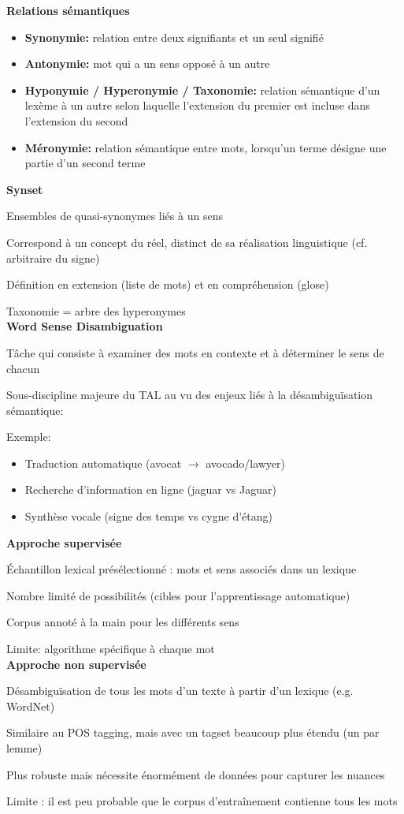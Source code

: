 \textbf{Relations sémantiques}

\begin{itemize}
\item \textbf{Synonymie:} relation entre deux signifiants et un seul signifié
\item \textbf{Antonymie:} mot qui a un sens opposé à un autre
\item \textbf{Hyponymie / Hyperonymie / Taxonomie:} relation sémantique d'un lexème à un autre selon laquelle l'extension du premier est incluse dans l'extension du second
\item \textbf{Méronymie:} relation sémantique entre mots, lorsqu'un terme désigne une partie d'un second terme\\
\end{itemize}

\textbf{Synset}

Ensembles de quasi-synonymes liés à un sens

Correspond à un concept du réel, distinct de sa réalisation linguistique (cf. arbitraire du signe)

Définition en extension (liste de mots) et en compréhension (glose)

Taxonomie = arbre des hyperonymes\\

\textbf{Word Sense Disambiguation}

Tâche qui consiste à examiner des mots en contexte et à déterminer le sens de chacun

Sous-discipline majeure du TAL au vu des enjeux liés à la désambiguïsation sémantique:

Exemple:
\begin{itemize}
    \item Traduction automatique (avocat $\rightarrow$ avocado/lawyer)
    \item Recherche d'information en ligne (jaguar vs Jaguar)
    \item Synthèse vocale (signe des temps vs cygne d'étang)\\
\end{itemize}

\textbf{Approche supervisée}

Échantillon lexical présélectionné : mots et sens associés dans un lexique

Nombre limité de possibilités (cibles pour l'apprentissage automatique)

Corpus annoté à la main pour les différents sens

Limite: algorithme spécifique à chaque mot\\

\textbf{Approche non supervisée}

Désambiguïsation de tous les mots d'un texte à partir d'un lexique (e.g. WordNet)

Similaire au POS tagging, mais avec un tagset beaucoup plus étendu (un par lemme)

Plus robuste mais nécessite énormément de données pour capturer les nuances

Limite : il est peu probable que le corpus d'entraînement contienne tous les mots\\
